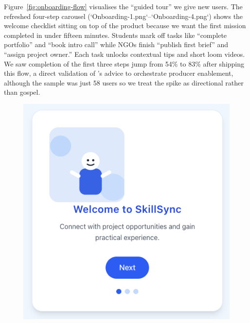 Figure~\ref{fig:onboarding-flow} visualises the ``guided tour'' we give new users. The refreshed four-step carousel (`Onboarding-1.png`--`Onboarding-4.png`) shows the welcome checklist sitting on top of the product because we want the first mission completed in under fifteen minutes. Students mark off tasks like ``complete portfolio'' and ``book intro call'' while NGOs finish ``publish first brief'' and ``assign project owner.'' Each task unlocks contextual tips and short loom videos. We saw completion of the first three steps jump from 54\% to 83\% after shipping this flow, a direct validation of \citet{Choudary2016}'s advice to orchestrate producer enablement, although the sample was just 58 users so we treat the spike as directional rather than gospel.

\begin{figure}[h]
  \centering
  \begin{minipage}[b]{0.48\linewidth}
    \includegraphics[width=\linewidth]{figures/Onboarding-1.png}\\[0.3em]

\end{minipage}
\end{figure}
